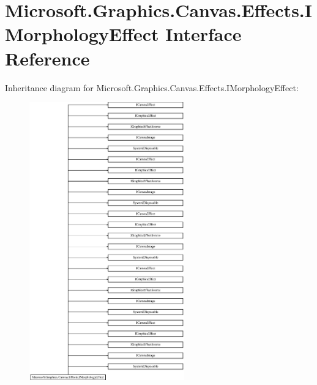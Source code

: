 \hypertarget{interface_microsoft_1_1_graphics_1_1_canvas_1_1_effects_1_1_i_morphology_effect}{}\section{Microsoft.\+Graphics.\+Canvas.\+Effects.\+I\+Morphology\+Effect Interface Reference}
\label{interface_microsoft_1_1_graphics_1_1_canvas_1_1_effects_1_1_i_morphology_effect}
Inheritance diagram for Microsoft.\+Graphics.\+Canvas.\+Effects.\+I\+Morphology\+Effect\+:\begin{figure}[H]
\begin{center}
\leavevmode
\includegraphics[height=12.000000cm]{interface_microsoft_1_1_graphics_1_1_canvas_1_1_effects_1_1_i_morphology_effect}
\end{center}
\end{figure}

